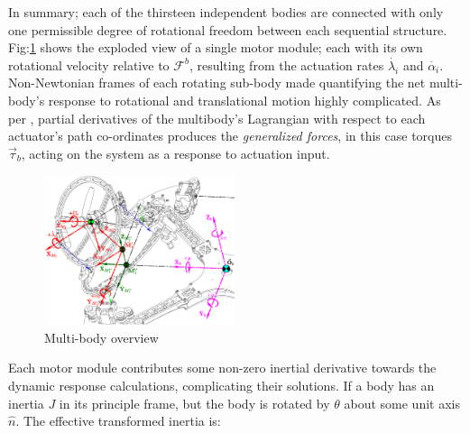 \documentclass[a4paper, 10pt, conference]{ieeeconf}
\begin{document}
\par
In summary; each of the thirsteen independent bodies are connected with only one permissible degree of rotational freedom between each sequential structure. Fig:\ref{fig:response-body} shows the exploded view of a single motor module; each with its own rotational velocity relative to $\mathcal{F}^b$, resulting from the actuation rates $\dot{\lambda_i}$ and $\dot{\alpha_i}$. Non-Newtonian frames of each rotating sub-body made quantifying the net multi-body's response to rotational and translational motion highly complicated. As per \cite{lagrange}, partial derivatives of the multibody's Lagrangian with respect to each actuator's path co-ordinates produces the \emph{generalized forces}, in this case torques $\vec{\tau}_b$, acting on the system as a response to actuation input.
\begin{figure}[bp]
\vspace{-15pt}
\centering
\includegraphics[width=0.5\textwidth]{figs/response-body}
\vspace{-20pt}
\caption{Multi-body overview}
\label{fig:response-body}
\vspace{-3pt}
\end{figure}
\newpage
Each motor module contributes some non-zero inertial derivative towards the dynamic response calculations, complicating their solutions. If a body has an inertia $J$ in its principle frame, but the body is rotated by $\theta$ about some unit axis $\hat{n}$. The effective transformed inertia is:
\end{document}
